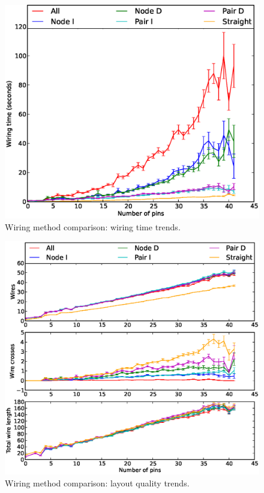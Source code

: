 \begin{figure}[H]
\begin{center}
\includegraphics[width=\textwidth]{Images/wiring_time_trend_comparison.eps}
\caption{Wiring method comparison: wiring time trends.}
\label{fig:wiring_time_trend}
\end{center}
\end{figure}

\begin{figure}[H]
\begin{center}
\includegraphics[width=\textwidth]{Images/wiring_quality_trend_comparison.eps}
\caption{Wiring method comparison: layout quality trends.}
\label{fig:wiring_quality_trend}
\end{center}
\end{figure}

